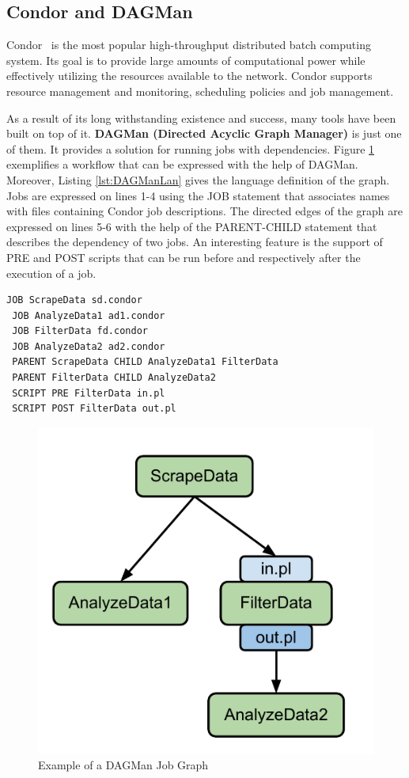 \documentclass[11pt,a4paper,twoside]{report}
\begin{document}
\subsection{Condor and DAGMan}
Condor~\cite{Condor} is the most popular high-throughput distributed batch computing system. Its goal is to provide large amounts of computational power while effectively utilizing the resources available to the network. Condor supports resource management and monitoring, scheduling policies and job management.


As a result of its long withstanding existence and success, many tools have been built on top of it. \textbf{DAGMan (Directed Acyclic Graph Manager)} is just one of them. It provides a solution for running jobs with dependencies. Figure \ref{fig:DAGMan} exemplifies a workflow that can be expressed with the help of DAGMan. Moreover, Listing \ref{lst:DAGManLan} gives the language definition of the graph. Jobs are expressed on lines 1-4 using the JOB statement that associates names with files containing Condor job descriptions. The directed edges of the graph are expressed on lines 5-6 with the help of the PARENT-CHILD statement that describes the dependency of two jobs. An interesting feature is the support of PRE and POST scripts that can be run before and respectively after the execution of a job.\\

\begin{lstlisting}[caption={Example of DAGMan's supported language},
label={lst:DAGManLan}]
 JOB ScrapeData sd.condor
 JOB AnalyzeData1 ad1.condor
 JOB FilterData fd.condor
 JOB AnalyzeData2 ad2.condor
 PARENT ScrapeData CHILD AnalyzeData1 FilterData
 PARENT FilterData CHILD AnalyzeData2
 SCRIPT PRE FilterData in.pl
 SCRIPT POST FilterData out.pl
\end{lstlisting}


\begin{figure}[h]
\centering
\includegraphics[scale=0.7]{DAGMan}
\caption{Example of a DAGMan Job Graph}
\label{fig:DAGMan}
\end{figure}
\end{document}
